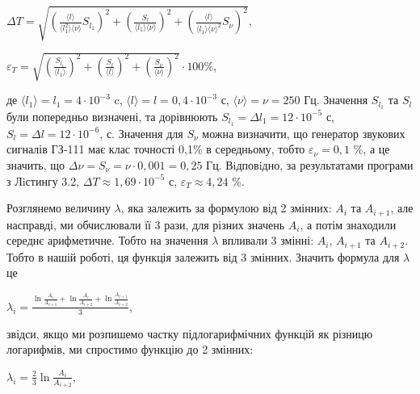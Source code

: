 \documentclass[12pt,a4paper]{article}
\begin{document}
    \begin{center}

        $\displaystyle \Delta T = \sqrt{\left( \frac{\text{⟨}l\text{⟩}}{\text{⟨}l_1^2\text{⟩} \text{⟨}\nu\text{⟩}} S_{l_1} \right)^2 + \left( \frac{S_l}{\text{⟨}l_1\text{⟩} \text{⟨}\nu\text{⟩}} \right)^2 + \left(\frac{\text{⟨}l\text{⟩}}{\text{⟨}l_1\text{⟩} \text{⟨}\nu\text{⟩}^2} S_{\nu}  \right)^2}$,

    \end{center}

    \begin{center}

        $\displaystyle \varepsilon_T = \sqrt{\left( \frac{S_{l_1}}{\text{⟨}l_1\text{⟩}} \right)^2 + \left( \frac{S_l}{\text{⟨}l\text{⟩}} \right)^2 + \left( \frac{S_{\nu }}{\text{⟨}\nu \text{⟩}} \right)^2} \cdot 100 \%$,

    \end{center}

    де $\text{⟨}l_1\text{⟩} = l_1 = 4 \cdot 10^{-3}$ c, $\text{⟨}l\text{⟩} = l = 0,4 \cdot 10^{-3}$ с, $\text{⟨}\nu\text{⟩} = \nu = 250$ Гц. Значення $S_{l_1}$ та $S_l$ були попередньо визначені, та дорівнюють $S_{l_1} = \Delta l_1 = 12 \cdot 10^{-5}$ с, $S_l = \Delta l = 12 \cdot 10^{-6}$, с.
    Значення для $S_{\nu}$ можна визначити, що генератор звукових сигналів ГЗ-111 має клас точності 0,1\% в середньому, тобто $\varepsilon_{\nu} = 0,1$ \%, а це значить, що $\Delta \nu = S_{\nu} = \nu \cdot 0,001 = 0,25$ Гц.
    Вiдповiдно, за результатами програми з Лiстингу 3.2, $\Delta T \approx 1,69 \cdot 10^{-5}$ с, $\varepsilon_T \approx 4,24$ \%.

    Розглянемо величину $\lambda$, яка залежить за формулою від 2 змінних: $A_i$ та $A_{i+1}$, але насправді, ми обчислювали її 3 рази, для різних значень $A_i$, а потім знаходили середнє арифметичне.
    Тобто на значення $\lambda$ впливали 3 змінні: $A_i$, $A_{i+1}$ та $A_{i+2}$. Тобто в нашій роботі, ця функція залежить від 3 змінних.
    Значить формула для $\lambda$ це 

    \begin{center}
        $\displaystyle \lambda_i = \frac{\ln \frac{A_i}{A_{i+1}} + \ln \frac{A_i}{A_{i+2}} + \ln \frac{A_{i+1}}{A_{i+2}}}{3}$,
    \end{center}

    звідси, якщо ми розпишемо частку підлогарифмічних функцій як різницю логарифмів, ми спростимо функцію до 2 змінних:

    \begin{center}
        $\displaystyle \lambda_i = \frac{2}{3} \ln \frac{A_i}{A_{i+2}}$,
    \end{center}
\end{document}
